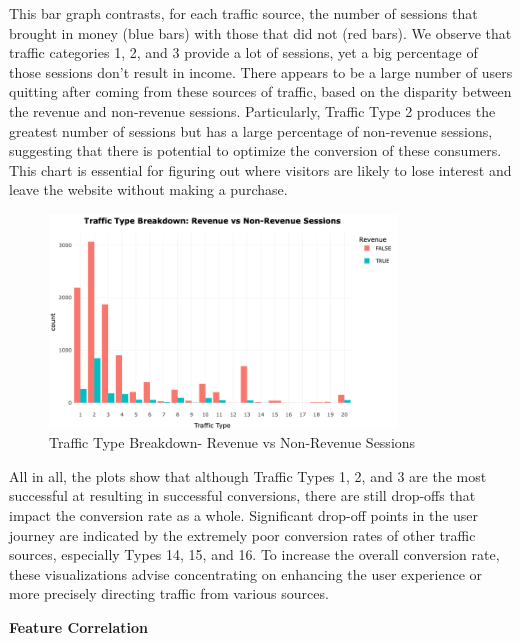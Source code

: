 \documentclass[12pt]{article}
\begin{document}
\FloatBarrier
This bar graph contrasts, for each traffic source, the number of sessions that brought in money (blue bars) with those that did not (red bars). We observe that traffic categories 1, 2, and 3 provide a lot of sessions, yet a big percentage of those sessions don't result in income. There appears to be a large number of users quitting after coming from these sources of traffic, based on the disparity between the revenue and non-revenue sessions. Particularly, Traffic Type 2 produces the greatest number of sessions but has a large percentage of non-revenue sessions, suggesting that there is potential to optimize the conversion of these consumers. This chart is essential for figuring out where visitors are likely to lose interest and leave the website without making a purchase.
\begin{figure}[h]
    \centering
    \includegraphics[width=0.82\textwidth]{Traffic Type Breakdown- Revenue vs Non-Revenue Sessions.png}  
    \caption{Traffic Type Breakdown- Revenue vs Non-Revenue Sessions}
\end{figure}
\vspace{0.5cm}

\FloatBarrier
All in all, the plots show that although Traffic Types 1, 2, and 3 are the most successful at resulting in successful conversions, there are still drop-offs that impact the conversion rate as a whole. Significant drop-off points in the user journey are indicated by the extremely poor conversion rates of other traffic sources, especially Types 14, 15, and 16. To increase the overall conversion rate, these visualizations advise concentrating on enhancing the user experience or more precisely directing traffic from various sources.
\vspace{0.5cm}

\textbf{Feature Correlation}\\
\end{document}
